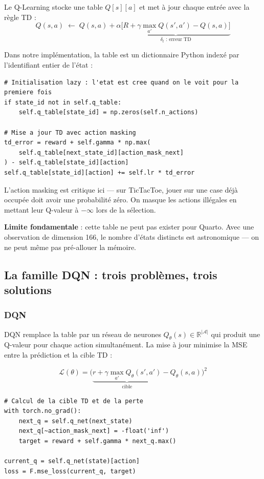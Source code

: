 \documentclass[12pt,a4paper]{article}
\begin{document}
Le Q-Learning stocke une table $Q[s][a]$ et met à jour chaque entrée avec la règle TD :
\[
Q(s,a) \;\leftarrow\; Q(s,a) + \alpha \underbrace{\bigl[R + \gamma \max_{a'} Q(s', a') - Q(s, a)\bigr]}_{\delta_t \text{ : erreur TD}}
\]

Dans notre implémentation, la table est un dictionnaire Python indexé par l'identifiant entier de l'état :

\begin{lstlisting}
# Initialisation lazy : l'etat est cree quand on le voit pour la premiere fois
if state_id not in self.q_table:
    self.q_table[state_id] = np.zeros(self.n_actions)

# Mise a jour TD avec action masking
td_error = reward + self.gamma * np.max(
    self.q_table[next_state_id][action_mask_next]
) - self.q_table[state_id][action]
self.q_table[state_id][action] += self.lr * td_error
\end{lstlisting}

L'action masking est critique ici — sur TicTacToe, jouer sur une case déjà occupée doit avoir une probabilité zéro. On masque les actions illégales en mettant leur Q-valeur à $-\infty$ lors de la sélection.

\textbf{Limite fondamentale} : cette table ne peut pas exister pour Quarto. Avec une observation de dimension 166, le nombre d'états distincts est astronomique — on ne peut même pas pré-allouer la mémoire.

\subsection{La famille DQN : trois problèmes, trois solutions}

\subsubsection{DQN}

DQN remplace la table par un réseau de neurones $Q_\theta(s) \in \mathbb{R}^{|\mathcal{A}|}$ qui produit une Q-valeur pour chaque action simultanément. La mise à jour minimise la MSE entre la prédiction et la cible TD :

\[
\mathcal{L}(\theta) = \bigl(\underbrace{r + \gamma \max_{a'} Q_\theta(s', a')}_{\text{cible}} - Q_\theta(s, a)\bigr)^2
\]

\begin{lstlisting}
# Calcul de la cible TD et de la perte
with torch.no_grad():
    next_q = self.q_net(next_state)
    next_q[~action_mask_next] = -float('inf')
    target = reward + self.gamma * next_q.max()

current_q = self.q_net(state)[action]
loss = F.mse_loss(current_q, target)
\end{lstlisting}
\end{document}
